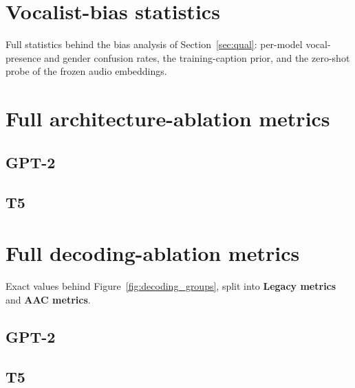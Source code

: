 \documentclass[9pt]{report}
\begin{document}
\clearpage
\begin{landscape}

\end{landscape}
\clearpage

\FloatBarrier
\section{Vocalist-bias statistics}
Full statistics behind the bias analysis of Section~\ref{sec:qual}: per-model
vocal-presence and gender confusion rates, the training-caption prior, and the
zero-shot probe of the frozen audio embeddings.




\FloatBarrier
\section{Full architecture-ablation metrics}

\subsection*{GPT-2}



\FloatBarrier
\subsection*{T5}



\FloatBarrier
\section{Full decoding-ablation metrics}
Exact values behind Figure~\ref{fig:decoding_groups}, split into
\textbf{Legacy metrics} and \textbf{AAC metrics}.

\subsection*{GPT-2}



\FloatBarrier
\subsection*{T5}


\end{document}
